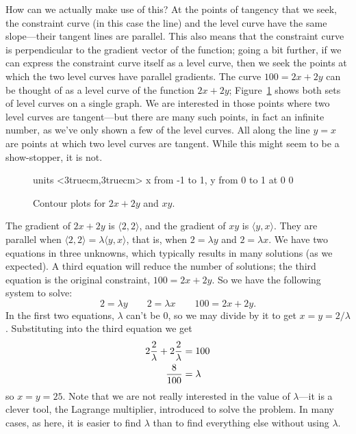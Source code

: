 How can we actually make use of this? At the points of tangency that
we seek, the constraint curve (in this case the line) and the level
curve have the same slope---their tangent lines are parallel. This also
means that the constraint curve is perpendicular to the gradient
vector of the function; going a bit further, if we can express the
constraint curve itself as a level curve, then we seek the points at
which the two level curves have parallel gradients.
The curve $100=2x+2y$ can be thought of as a level curve of the
function $2x+2y$; Figure~\ref{fig:lagrange two} shows both sets of
level curves on a single graph. We are interested in those points
where two level curves are tangent---but there are many such points,
in fact an infinite number, as we've only shown a few of the level
curves. All along the line $y=x$ are points at which two level curves
are tangent. While this might seem to be a show-stopper, it is
not. 

\begin{figure}[H]
\centerline{
\vbox{\beginpicture
\normalgraphs
\setcoordinatesystem units <3truecm,3truecm>
\setplotarea x from -1 to 1, y from 0 to 1
 at 0 0
\endpicture}}
\caption{Contour plots for $2x+2y$ and $xy$.}
\label{fig:lagrange two}
\end{figure}

The gradient of $2x+2y$ is $\langle 2,2\rangle$, and the gradient of
$xy$ is $\langle y,x\rangle$. They are parallel when
$\langle 2,2\rangle=\lambda\langle y,x\rangle$, that is, when
$2=\lambda y$ and $2=\lambda x$. We have two equations in three
unknowns, which typically results in many solutions (as we
expected). A third equation will reduce the number of solutions; the
third equation is the original constraint, $100=2x+2y$. So we have the
following system to solve:
$$2=\lambda y \qquad 2=\lambda x\qquad 100=2x+2y.$$
In the first two equations, $\lambda$ can't be 0, so we may divide by
it to get $x=y=2/\lambda$. Substituting into the third equation we get 
\begin{align*}
2{2\over \lambda}+2{2\over \lambda}&=100	\\
{8\over100}&=\lambda	\\
\end{align*}
so $x=y=25$. Note that we are not really interested in the value of
$\lambda$---it is a clever tool, the Lagrange multiplier, introduced
to solve the problem. In many cases, as here, it is easier to find
$\lambda$ than to find everything else without using $\lambda$.

